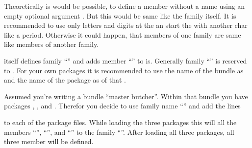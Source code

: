 Theoretically is would be possible, to define a member without a name using an
empty optional argument . But this would be same like the
family itself. It is recommended to use only letters and digits at the
 an start the  with another char like a
period. Otherwise it could happen, that members of one family are same like
members of another family.

 itself defines family ``'' and adds member
``'' to is. Generally family ``'' is
reserved to \KOMAScript{}. For your own packages it is recommended to use the
name of the bundle as  and the name of the package as
 of that .
%
\begin{Example}
  Assumed you're writing a bundle ``master butcher''. Within that bundle you
  have packages , , and
  . Therefor you decide to use family name
  ``'' and add the lines
\begin{lstcode}
\end{lstcode}
  to each of the package files. While loading the three packages this will
  all the members ``'', ``'',
  and ``'' to the family ``''. After
  loading all three packages, all three member will be defined.
\end{Example}
%
%
%


